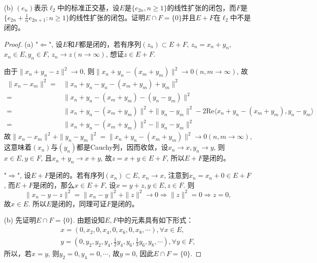 \documentclass[a4paper,8pt]{ctexart}\textwidth 140mm \textheight 216mm
\newcommand{\8}{\infty}
\newcommand{\la}{\langle}
\newcommand{\ra}{\rangle}
\begin{document}
(b) $(e_n)$表示$\ell_2$中的标准正交基，设$E$是$\{e_{2n},n\geq 1\}$的线性扩张的闭包，而$F$是$\{e_{2n}+\frac{1}{n}e_{2n+1}:n\geq 1\}$的线性扩张的闭包。证明$E\cap F=\{0\}$并且$E+F$在$\ell_2$中不是闭的。
\begin{proof}
	(a) "$\Leftarrow$", 设$E$和$F$都是闭的，若有序列$(z_n)\subset E+F$, $z_n=x_n+y_n$, $x_n\in E,y_n\in F$, $z_n\to z(n\to\infty)$, 想证$z\in E+F$. 
	
	由于$\|x_n+y_n-z\|^2\to 0$, 则$\|x_n+y_n-(x_m+y_m)\|^2\to 0(n,m\to\infty)$, 故
	\begin{equation*}
	\begin{split}
	\|x_n-x_m\|^2=&\|x_n+y_n-y_n-(x_m+y_m)+y_m\|^2\\
	=&\|x_n+y_n-(x_m+y_m)-(y_n-y_m)\|^2\\
	=&\|x_n+y_n-(x_m+y_m)\|^2+\|y_n-y_m\|^2-2\mathrm{Re}\la x_n+y_n-(x_m+y_m),y_n-y_m\ra\\
	=&\|x_n+y_n-(x_m+y_m)\|^2-\|y_n-y_m\|^2
	\end{split}
	\end{equation*}
	故$\|x_n-x_m\|^2+\|y_n-y_m\|^2=\|x_n+y_n-(x_m+y_m)\|^2\to 0(n,m\to\infty)$, 这意味着$(x_n)$与$(y_n)$都是Cauchy列，因而收敛，设$x_n\to x,y_n\to y$, 则$x\in E,y\in F$, 且$x_n+y_n\to x+y$, 故$z=x+y\in E+F$, 所以$E+F$是闭的。
	
	"$\Rightarrow$", 设$E+F$是闭的。若有序列$(x_n)\subset E$, $x_n\to x$, 注意到$x_n=x_n+0\in E+F$, 而$E+F$是闭的，那么$x\in E+F$, 设$x=y+z,y\in E,z\in　F$. 则
	\begin{equation*}
	\|x_n-y-z\|^2=\|x_n-y\|^2+\|z\|^2\to 0\Rightarrow \|z\|^2=0\Rightarrow z=0,
	\end{equation*}
	故$x\in E$. 所以$E$是闭的，同理可证$F$是闭的。
	
	(b) 先证明$E\cap F=\{0\}$. 由题设知$E,F$中的元素具有如下形式：
	\begin{equation*}
	\begin{split}
	x=(0,x_2,0,x_4,0,x_6,0,x_8,\cdots), \forall x\in E,\\
	y=(0,y_2,y_2,y_4,\frac{1}{2}y_4,y_6,\frac{1}{3}y_6,y_8,\cdots), \forall y\in F,
	\end{split}
	\end{equation*}
	所以，若$x=y$, 则$y_2=0,y_4=0,\cdots$, 故$y=0$, 因此$E\cap F=\{0\}$.
	

\end{proof}
\end{document}
